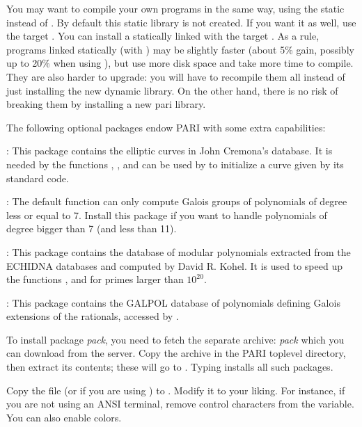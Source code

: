 You may want to compile your own programs in the same way, using the static
 instead of . By default this static library
 is not created. If you want it as well, use the target
. You can install a statically linked  with
the target . As a rule, programs linked statically
(with ) may be slightly faster (about 5\% gain, possibly
up to 20\% when using ), but use more disk space and take more
time to compile. They are also harder to upgrade: you will have to recompile
them all instead of just installing the new dynamic library. On the other
hand, there is no risk of breaking them by installing a new pari library.

 The following optional packages endow PARI with some
extra capabilities:

\item {}: This package contains the elliptic curves in
John Cremona's database. It is needed by the functions ,
,  and can be used by  to initialize a curve given by its standard code.

\item {}: The default  function can only
compute Galois groups of polynomials of degree less or equal to 7. Install
this package if you want to handle polynomials of degree bigger than 7 (and
less than 11).

\item {}: This package contains the database of modular
polynomials extracted from the ECHIDNA databases and computed by David R.
Kohel. It is used to speed up the functions ,  and
 for primes larger than $10^{20}$.

\item {}: This package contains the GALPOL database of polynomials
defining Galois extensions of the rationals, accessed by .

\medskip

To install package \emph{pack}, you need to fetch the separate archive:
\emph{pack} which you can download from the  server.
Copy the archive in the PARI toplevel directory, then extract its
contents; these will go to . Typing  installs all such packages.

 Copy the file  (or
 if you are using ) to . Modify
it to your liking. For instance, if you are not using an ANSI terminal,
remove control characters from the  variable. You can also
enable colors.

